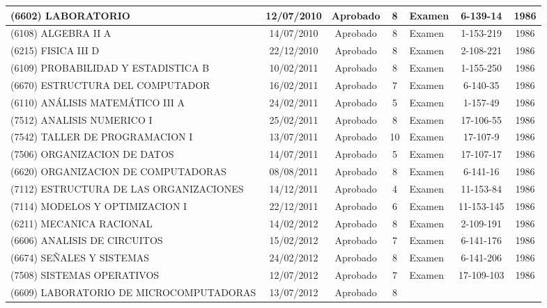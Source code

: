 \begin{center}
\begin{longtable}{|p{3.5cm}|c|c|c|p{1.4cm}|c|c|}
        \hline
        (6602) LABORATORIO & 12/07/2010 & Aprobado & 8 & Examen & 6-139-14 &
        1986 \\
        \hline
        (6108) ALGEBRA II A & 14/07/2010 & Aprobado & 8 & Examen & 1-153-219
        & 1986 \\
        \hline
        (6215) FISICA III D & 22/12/2010 & Aprobado & 8 & Examen & 2-108-221
        & 1986 \\
        \hline
        (6109) PROBABILIDAD Y ESTADISTICA B & 10/02/2011 & Aprobado & 8 & 
        Examen & 1-155-250 & 1986 \\
        \hline
        (6670) ESTRUCTURA DEL COMPUTADOR & 16/02/2011 & Aprobado & 7 & 
        Examen & 6-140-35 & 1986 \\
        \hline
        (6110) ANÁLISIS MATEMÁTICO III A & 24/02/2011 & Aprobado & 5 & 
        Examen & 1-157-49 & 1986 \\
        \hline
        (7512) ANALISIS NUMERICO I & 25/02/2011 & Aprobado & 8 & Examen & 
        17-106-55 & 1986 \\
        \hline
        (7542) TALLER DE PROGRAMACION I & 13/07/2011 & Aprobado & 10 & 
        Examen & 17-107-9 & 1986 \\
        \hline
        (7506) ORGANIZACION DE DATOS & 14/07/2011 & Aprobado & 5 & Examen & 
        17-107-17 & 1986 \\
        \hline
        (6620) ORGANIZACION DE COMPUTADORAS & 08/08/2011 & Aprobado & 8 & 
        Examen & 6-141-16 & 1986 \\
        \hline
        (7112) ESTRUCTURA DE LAS ORGANIZACIONES & 14/12/2011 & Aprobado & 4 
        & Examen & 11-153-84 & 1986 \\
        \hline
        (7114) MODELOS Y OPTIMIZACION I & 22/12/2011 & Aprobado & 6 & Examen
        & 11-153-145 & 1986 \\
        \hline
        (6211) MECANICA RACIONAL & 14/02/2012 & Aprobado & 8 & Examen & 
        2-109-191 & 1986 \\
        \hline
        (6606) ANALISIS DE CIRCUITOS & 15/02/2012 & Aprobado & 7 & Examen &
        6-141-176 & 1986 \\
        \hline
        (6674) SEÑALES Y SISTEMAS & 24/02/2012 & Aprobado & 8 & Examen & 
        6-141-206 & 1986 \\
        \hline
        (7508) SISTEMAS OPERATIVOS & 12/07/2012 & Aprobado & 7 & Examen & 
        17-109-103 & 1986 \\
        \hline
        (6609) LABORATORIO DE MICROCOMPUTADORAS & 13/07/2012 & Aprobado & 8

\end{longtable}
\end{center}
